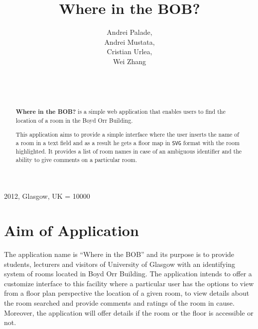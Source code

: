 \documentclass{sig-alt-release2}
\begin{document}
\newcommand{\todo}[1]{\textcolor{red}{#1}}
\def\newblock{\hskip .11em plus .33em minus .07em}

 {2012, Glasgow, UK} 
\widowpenalty = 10000

\title{{Where in the BOB?}}

\author{
\alignauthor
Andrei Palade,\\
Andrei Mustata,\\
Cristian Urlea,\\
Wei Zhang\\
	  \\
      \\
      \\
}
\maketitle

\begin{abstract}

\textbf{Where in the BOB?} is a simple web application that enables users to
find the location of a room in the Boyd Orr Building. 
   
This application aims to provide a simple interface where the user inserts the
name of a room in a text field and as a result he gets a floor map in \texttt{SVG}
format with the room highlighted. It provides a list of room names in case of
an ambiguous identifier and the ability to give comments on a particular room. 

\end{abstract}

\section{Aim of Application}

The application name is ``Where in the BOB'' and its purpose is to provide
students, lecturers and visitors of University of Glasgow with an identifying
system of rooms located in Boyd Orr Building. The application intends to
offer a customize interface to this facility where a particular user has the
options to view from a floor plan perspective the location of a given room,
to view details about the room searched and provide comments and ratings of
the room in cause. Moreover, the application will offer details if the room
or the floor is accessible or not.
\end{document}
